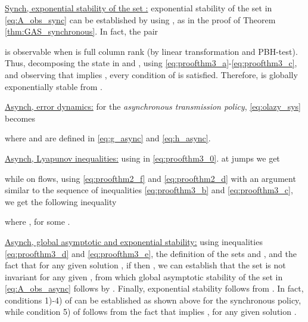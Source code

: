 \documentclass[twocolumn]{autart}
\newenvironment{proofof}{\noindent {\em Proof of }}{\hfill \hspace*{1pt}
\hfill }
\begin{document}
\begin{proofof}{\emph{Theorem \ref{thm:GASoutput}}.}
{ \underline{Synch, exponential stability of the set :}}
exponential stability of the set  in \eqref{eq:A_obs_sync}
can be established by using \cite[Theorem 2]{TeelTAC13},
as in the proof of Theorem \ref{thm:GAS_synchronous}. In fact, 
the pair 

is observable when  is full column rank 
(by linear transformation and PBH-test).
Thus, decomposing the state  
in  and ,
using \eqref{eq:proofthm3_a}-\eqref{eq:proofthm3_c},
and observing that 
 implies ,
every condition of \cite[Assumption 1]{TeelTAC13} is satisfied.
Therefore,  is globally exponentially stable
from \cite[Theorem 2]{TeelTAC13}.

{ \underline{Asynch, error dynamics:}} 
for the \emph{asynchronous transmission policy}, \eqref{eq:olazy_sys} becomes 

where  and  are defined in \eqref{eq:g_async} and \eqref{eq:h_async}.

{ \underline{Asynch, Lyapunov inequalities:}} 
using  in \eqref{eq:proofthm3_0}. at jumps we get

while on flows, using \eqref{eq:proofthm2_f} and \eqref{eq:proofthm2_d}
with an argument similar to the sequence of inequalities 
\eqref{eq:proofthm3_b} and \eqref{eq:proofthm3_c},
we get the following inequality

where ,
for some .

{ \underline{Asynch, global asymptotic and exponential stability:}} 
using inequalities \eqref{eq:proofthm3_d} and \eqref{eq:proofthm3_e},
the definition of the sets  and ,
and the fact that for any given solution , if  then 
, we can establish that the set  is not invariant
for any given , from which global asymptotic stability of the set 
in \eqref{eq:A_obs_async} follows by \cite[Theorem 23]{GoebelCSM09}.
Finally, exponential stability follows from \cite[Theorem 2]{TeelTAC13}.
In fact, conditions 1)-4) of \cite[Assumption 1]{TeelTAC13} can be established 
as shown above for the synchronous policy, while condition 5) of \cite[Assumption 1]{TeelTAC13}
follows from the fact that  implies , for any given solution . 
\end{proofof}
\end{document}
